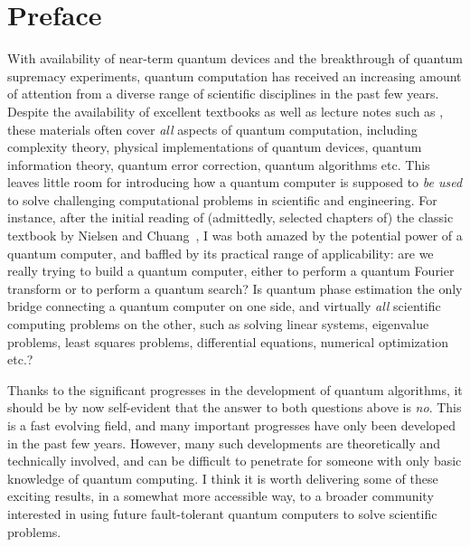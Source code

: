 \chapter*{Preface}

With availability of near-term quantum devices and the breakthrough of quantum supremacy experiments, quantum computation has received an increasing amount of attention from a diverse range of scientific disciplines in the past few years. 
Despite the availability of excellent textbooks as well as lecture notes such as \cite{NielsenChuang2000,KitaevShenVyalyi2002,Nakahara2008,RieffelPolak2011,Aaronson2013,PreskillQuantumLec,DeWolfQuantumLec,ChildsQuantumLec}, these materials often cover \textit{all} aspects of quantum computation, including complexity theory, physical implementations of quantum devices, quantum information theory, quantum error correction, quantum algorithms etc. This leaves little room for introducing how a quantum computer is supposed to \textit{be used} to solve challenging computational problems in scientific and engineering. 
For instance, after the initial reading of (admittedly, selected chapters of) the classic textbook by Nielsen and Chuang~\cite{NielsenChuang2000}, I was both amazed by the potential power of a quantum computer, and baffled by its practical range of applicability: are we really trying to build a quantum computer,  either to perform a quantum Fourier transform or to perform a quantum search? 
Is quantum phase estimation the only bridge connecting a quantum computer on one side, and virtually \textit{all} scientific computing problems on the other, such as solving linear systems, eigenvalue problems, least squares problems, differential equations, numerical optimization etc.?

Thanks to the significant progresses in the development of quantum algorithms, it should be by now self-evident that the answer to both questions above is \textit{no}. 
This is a fast evolving field, and many important progresses have only been developed in the past few years. 
However, many such developments are theoretically and technically involved, and can be difficult to penetrate for someone with only basic knowledge of quantum computing.
I think it is worth delivering some of these exciting results, in a somewhat more accessible way, to a broader community interested in using future fault-tolerant quantum computers to solve scientific problems. 

